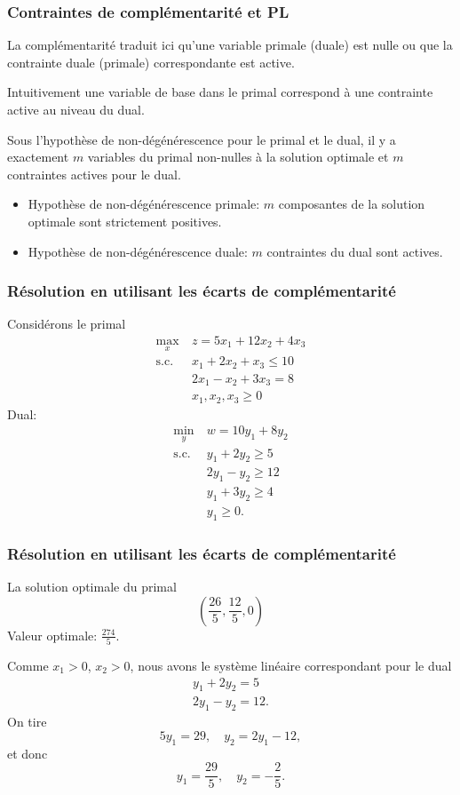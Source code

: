 \documentclass[usepdftitle=false]{beamer}
\begin{document}
\begin{frame}
	\frametitle{Contraintes de complémentarité et PL}
	
	La complémentarité traduit ici qu'une variable primale (duale) est nulle ou que la contrainte duale (primale) correspondante est active.
	
	\mbox{}
	
	Intuitivement une variable de base dans le primal correspond à une contrainte active au niveau du dual.
	
	\mbox{}
	
	Sous l'hypothèse de non-dégénérescence pour le primal et le dual, il y a exactement $m$ variables du primal non-nulles à la solution optimale et $m$ contraintes actives pour le dual.
	\begin{itemize}
		\item 
		Hypothèse de non-dégénérescence primale: $m$ composantes de la solution optimale sont strictement positives.
		\item 
		Hypothèse de non-dégénérescence duale: $m$ contraintes du dual sont actives.
	\end{itemize}
	
\end{frame}

\begin{frame}
	\frametitle{Résolution en utilisant les écarts de complémentarité}
	
	Considérons le primal
	\begin{align*}
		\max_x\ & z = 5x_1 +12x_2 +4x_3\\
		\mbox{s.c. } & x_1 + 2x_2 + x_3 \leq 10 \\
		& 2x_1 - x_2 +3x_3 = 8 \\
		& x_1, x_2, x_3 \geq 0
	\end{align*}
	Dual:
	\begin{align*}
		\min_y\ & w = 10y_1 + 8y_2 \\
		\mbox{s.c. } & y_1 + 2y_2 \geq 5 \\
		& 2y_1 - y_2 \geq 12 \\
		& y_1 + 3y_2 \geq 4\\
		& y_1 \geq 0.
	\end{align*}
	
\end{frame}

\begin{frame}
	\frametitle{Résolution en utilisant les écarts de complémentarité}
	
	La solution optimale du primal
	\[
	\left(
	\frac{26}{5}, \frac{12}{5}, 0
	\right)
	\]
	Valeur optimale: $\frac{274}{5}$.
	
	\mbox{}
	
	Comme $x_1 > 0$, $x_2 > 0$, nous avons le système linéaire correspondant pour le dual
	\begin{align*}
		y_1 + 2y_2 = 5\\
		2y_1 - y_2 = 12.
	\end{align*}
	On tire
	\[
	5y_1 = 29,\quad y_2 = 2y_1 - 12,
	\]
	et donc
	\[
	y_1 = \frac{29}{5},\quad y_2 = -\frac{2}{5}.
	\]
	
\end{frame}
\end{document}
